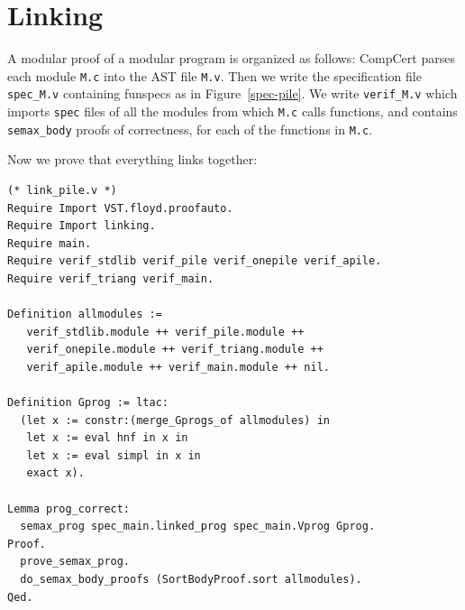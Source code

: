 \documentclass[runningheads,orivec]{llncs}
\begin{document}
\section{Linking}
A modular proof of a modular program is organized as follows:
CompCert parses each module \lstinline{M.c}
into the AST file \lstinline{M.v}.
Then we write the specification file \lstinline{spec_M.v}
containing funspecs as in Figure~\ref{spec-pile}.
We write \lstinline{verif_M.v} which imports
\lstinline{spec} files of all the modules from
which \lstinline{M.c} calls functions,
and contains \lstinline{semax_body} proofs of correctness,
for each of the functions in \lstinline{M.c}.

Now we prove that everything links together:

\begin{lstlisting}
(* link_pile.v *)
Require Import VST.floyd.proofauto.
Require Import linking.
Require main.
Require verif_stdlib verif_pile verif_onepile verif_apile.
Require verif_triang verif_main.

Definition allmodules := 
   verif_stdlib.module ++ verif_pile.module ++
   verif_onepile.module ++ verif_triang.module ++
   verif_apile.module ++ verif_main.module ++ nil.

Definition Gprog := ltac:
  (let x := constr:(merge_Gprogs_of allmodules) in
   let x := eval hnf in x in
   let x := eval simpl in x in 
   exact x).

Lemma prog_correct:
  semax_prog spec_main.linked_prog spec_main.Vprog Gprog.
Proof.
  prove_semax_prog.
  do_semax_body_proofs (SortBodyProof.sort allmodules).
Qed.
\end{lstlisting}
\end{document}
